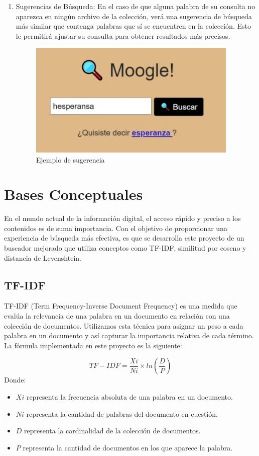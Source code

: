 \documentclass[a4paper, 12pt]{article}
\begin{document}
\begin{enumerate}
\item Sugerencias de Búsqueda:
   En el caso de que alguna palabra de su consulta no aparezca en ningún archivo de la colección, verá una sugerencia de búsqueda más similar que contenga palabras que sí se encuentren en la colección. Esto le permitirá ajustar su consulta para obtener resultados más precisos.

\begin{figure}[h]
       \center
       \includegraphics[width=10cm]{Web3.jpg}
       \caption{Ejemplo de sugerencia}
       \label{fig:suggestion}
\end{figure}
\end{enumerate}





\newpage
\section{Bases Conceptuales}\label{sec;base}
En el mundo actual de la información digital, el acceso rápido y preciso a los contenidos es de suma importancia. Con el objetivo de proporcionar una experiencia de búsqueda más efectiva, es que se desarrolla este proyecto de un buscador mejorado que utiliza conceptos como TF-IDF, similitud por coseno y distancia de Levenshtein.

\subsection{TF-IDF}
TF-IDF (Term Frequency-Inverse Document Frequency) es una medida que evalúa la relevancia de una palabra en un documento en relación con una colección de documentos. Utilizamos esta técnica para asignar un peso a cada palabra en un documento y así capturar la importancia relativa de cada término. La fórmula implementada en este proyecto es la siguiente:

\[TF-IDF = \frac{Xi}{Ni} \times ln\left(\frac{D}{P}\right)\]
Donde:
\begin{itemize}
\item $Xi$
representa la frecuencia absoluta de una palabra en un documento.
\item $Ni$
representa la cantidad de palabras del documento en cuestión.
\item $D$
representa la cardinalidad de la colección de documentos.
\item $P$
representa la cantidad de documentos en los que aparece la palabra.
\end{itemize}
\end{document}
